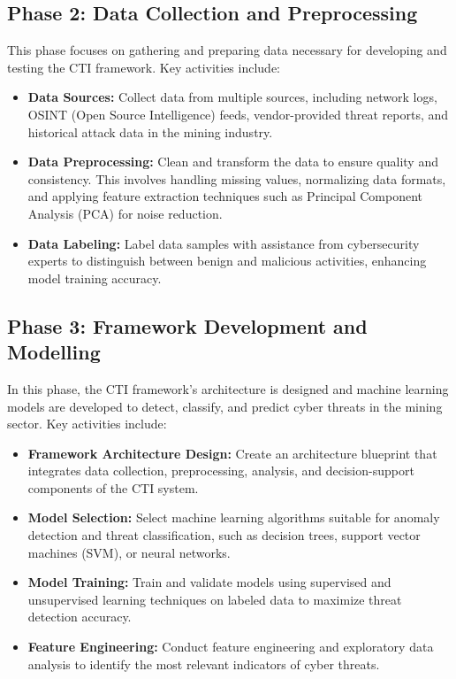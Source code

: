 \documentclass[a4paper,twoside,12pt]{report}
\begin{document}
\subsection{Phase 2: Data Collection and Preprocessing}  
This phase focuses on gathering and preparing data necessary for developing and testing the CTI framework. Key activities include:
\begin{itemize}
    \item \textbf{Data Sources:} Collect data from multiple sources, including network logs, OSINT (Open Source Intelligence) feeds, vendor-provided threat reports, and historical attack data in the mining industry.
    \item \textbf{Data Preprocessing:} Clean and transform the data to ensure quality and consistency. This involves handling missing values, normalizing data formats, and applying feature extraction techniques such as Principal Component Analysis (PCA) for noise reduction.
    \item \textbf{Data Labeling:} Label data samples with assistance from cybersecurity experts to distinguish between benign and malicious activities, enhancing model training accuracy.
\end{itemize}

\subsection{Phase 3: Framework Development and Modelling}  
In this phase, the CTI framework’s architecture is designed and machine learning models are developed to detect, classify, and predict cyber threats in the mining sector. Key activities include:
\begin{itemize}
    \item \textbf{Framework Architecture Design:} Create an architecture blueprint that integrates data collection, preprocessing, analysis, and decision-support components of the CTI system.
    \item \textbf{Model Selection:} Select machine learning algorithms suitable for anomaly detection and threat classification, such as decision trees, support vector machines (SVM), or neural networks.
    \item \textbf{Model Training:} Train and validate models using supervised and unsupervised learning techniques on labeled data to maximize threat detection accuracy.
    \item \textbf{Feature Engineering:} Conduct feature engineering and exploratory data analysis to identify the most relevant indicators of cyber threats.
\end{itemize}
\end{document}
